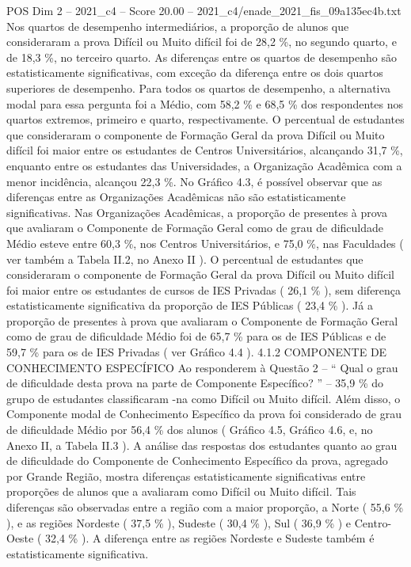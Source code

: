 \begin{textsample}{POS Dim 2 – 2021\_c4 – Score 20.00 – 2021\_c4/enade\_2021\_fis\_09a135ec4b.txt}
Nos quartos de desempenho intermediários, a proporção de alunos que consideraram a prova Difícil ou Muito difícil foi de 28,2 \%, no segundo quarto, e de 18,3 \%, no terceiro quarto.
As diferenças entre os quartos de desempenho são estatisticamente significativas, com exceção da diferença entre os dois quartos superiores de desempenho.
Para todos os quartos de desempenho, a alternativa modal para essa pergunta foi a Médio, com 58,2 \% e 68,5 \% dos respondentes nos quartos extremos, primeiro e quarto, respectivamente.
O percentual de estudantes que consideraram o componente de Formação Geral da prova Difícil ou Muito difícil foi maior entre os estudantes de Centros Universitários, alcançando 31,7 \%, enquanto entre os estudantes das Universidades, a Organização Acadêmica com a menor incidência, alcançou 22,3 \%.
No Gráfico 4.3, é possível observar que as diferenças entre as Organizações Acadêmicas não são estatisticamente significativas.
Nas Organizações Acadêmicas, a proporção de presentes à prova que avaliaram o Componente de Formação Geral como de grau de dificuldade Médio esteve entre 60,3 \%, nos Centros Universitários, e 75,0 \%, nas Faculdades ( ver também a Tabela II.2, no Anexo II ).
O percentual de estudantes que consideraram o componente de Formação Geral da prova Difícil ou Muito difícil foi maior entre os estudantes de cursos de IES Privadas ( 26,1 \% ), sem diferença estatisticamente significativa da proporção de IES Públicas ( 23,4 \% ).
Já a proporção de presentes à prova que avaliaram o Componente de Formação Geral como de grau de dificuldade Médio foi de 65,7 \% para os de IES Públicas e de 59,7 \% para os de IES Privadas ( ver Gráfico 4.4 ). 4.1.2 COMPONENTE DE CONHECIMENTO ESPECÍFICO Ao responderem à Questão 2 – “ Qual o grau de dificuldade desta prova na parte de Componente Específico? ” – 35,9 \% do grupo de estudantes classificaram -na como Difícil ou Muito difícil.
Além disso, o Componente modal de Conhecimento Específico da prova foi considerado de grau de dificuldade Médio por 56,4 \% dos alunos ( Gráfico 4.5, Gráfico 4.6, e, no Anexo II, a Tabela II.3 ).
A análise das respostas dos estudantes quanto ao grau de dificuldade do Componente de Conhecimento Específico da prova, agregado por Grande Região, mostra diferenças estatisticamente significativas entre proporções de alunos que a avaliaram como Difícil ou Muito difícil.
Tais diferenças são observadas entre a região com a maior proporção, a Norte ( 55,6 \% ), e as regiões Nordeste ( 37,5 \% ), Sudeste ( 30,4 \% ), Sul ( 36,9 \% ) e Centro-Oeste ( 32,4 \% ).
A diferença entre as regiões Nordeste e Sudeste também é estatisticamente significativa.

\end{textsample}
